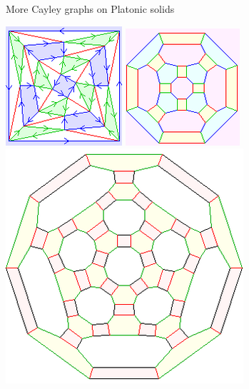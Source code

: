 \documentclass[8pt, handout]{beamer}
\begin{document}
\begin{frame}{More Cayley graphs on Platonic solids}
  \begin{center}
      \includegraphics[width=.32\textwidth]{snub-cube.png}
      \includegraphics[width=.32\textwidth]{trunc-cuboctahedron.png}
      \includegraphics[width=.32\textwidth]{great-rhombicosidodec.png}
  \end{center}

\end{frame}

\end{document}
